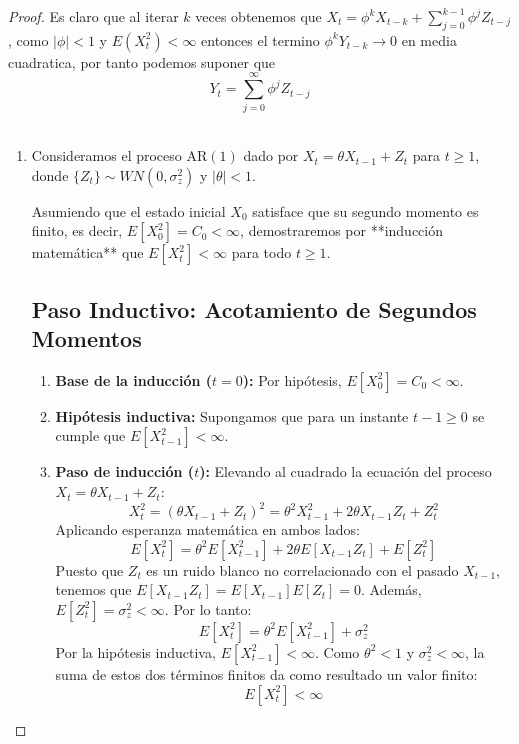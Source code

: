 \documentclass[11pt,letterpaper]{article}
\begin{document}
\begin{proof}
    Es claro que al iterar $k$ veces obtenemos que $X_t=\phi^kX_{t-k}+\sum_{j=0}^{k-1}\phi^jZ_{t-j}$, como $|\phi|<1$ y $E(X^2_{t})<\infty$ entonces el termino $\phi^kY_{t-k}\to 0$ en media cuadratica, por tanto podemos suponer que
    \begin{equation*}
        Y_t=\sum_{j=0}^\infty \phi^jZ_{t-j}
    \end{equation*}\,\\
    \begin{enumerate}
        \item Consideramos el proceso $\text{AR}(1)$ dado por $X_t = \theta X_{t-1} + Z_t$ para $t \ge 1$, donde $\{Z_t\} \sim WN(0, \sigma_z^2)$ y $|\theta| < 1$. 

Asumiendo que el estado inicial $X_0$ satisface que su segundo momento es finito, es decir, $E[X_0^2] = C_0 < \infty$, demostraremos por **inducción matemática** que $E[X_t^2] < \infty$ para todo $t \ge 1$.

\subsection*{Paso Inductivo: Acotamiento de Segundos Momentos}

\begin{enumerate}
    \item \textbf{Base de la inducción ($t = 0$):}
    Por hipótesis, $E[X_0^2] = C_0 < \infty$.

    \item \textbf{Hipótesis inductiva:}
    Supongamos que para un instante $t - 1 \ge 0$ se cumple que $E[X_{t-1}^2] < \infty$.

    \item \textbf{Paso de inducción ($t$):}
    Elevando al cuadrado la ecuación del proceso $X_t = \theta X_{t-1} + Z_t$:
    \[
    X_t^2 = (\theta X_{t-1} + Z_t)^2 = \theta^2 X_{t-1}^2 + 2\theta X_{t-1}Z_t + Z_t^2
    \]
    Aplicando esperanza matemática en ambos lados:
    \[
    E[X_t^2] = \theta^2 E[X_{t-1}^2] + 2\theta E[X_{t-1} Z_t] + E[Z_t^2]
    \]
    Puesto que $Z_t$ es un ruido blanco no correlacionado con el pasado $X_{t-1}$, tenemos que $E[X_{t-1} Z_t] = E[X_{t-1}] E[Z_t] = 0$. Además, $E[Z_t^2] = \sigma_z^2 < \infty$. Por lo tanto:
    \[
    E[X_t^2] = \theta^2 E[X_{t-1}^2] + \sigma_z^2
    \]
    Por la hipótesis inductiva, $E[X_{t-1}^2] < \infty$. Como $\theta^2 < 1$ y $\sigma_z^2 < \infty$, la suma de estos dos términos finitos da como resultado un valor finito:
    \[
    E[X_t^2] < \infty
    \]
\end{enumerate}


\end{enumerate}
\end{proof}
\end{document}
